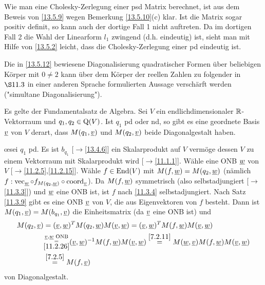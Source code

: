\documentclass[../../main.tex]{subfiles}
\begin{document}
\begin{bem}\label{14.2.14}
Wie man eine Cholesky-Zerlegung einer psd Matrix berechnet, ist aus dem Beweis von \ref{13.5.9} wegen Bemerkung \ref{13.5.10}(c) klar. Ist die Matrix sogar positiv definit, so kann auch der dortige Fall 1 nicht auftreten. Da im dortigen Fall 2 die Wahl der Linearform $l_1$ zwingend (d.h. eindeutig) ist, sieht man mit Hilfe von \ref{13.5.2} leicht, dass die Cholesky-Zerlegung einer pd eindeutig ist.
\end{bem}

Die in \ref{13.5.12} bewiesene Diagonalisierung quadratischer Formen über beliebigen Körper mit $0\neq 2$ kann über dem Körper der reellen Zahlen zu folgender in $\S 11.3$ in einer anderen Sprache formulierten Aussage verschärft werden ("simultane Diagonalisierung").

\begin{sat}\label{14.2.15}
Es gelte der Fundamentalsatz de Algebra. Sei $V$ ein endlichdimensionaler $\mathbb R$-Vektorraum und $q_1,q_2\in \operatorname{Q}(V)$. Ist $q_1$ pd oder nd, so gibt es eine geordnete Basis ${\underline v}$ von $V$ derart, dass $M(q_1,{\underline v})$ und $M(q_2,{\underline v})$ beide Diagonalgestalt haben.
\end{sat}
\begin{cproof}
\oe sei $q_1$ pd. Es ist $b_{q_1}$ [$\to$\ref{13.4.6}] ein Skalarprodukt auf $V$ vermöge dessen $V$ zu einem Vektorraum mit Skalarprodukt wird [$\to$\ref{11.1.1}]. Wähle eine ONB ${\underline w}$ von $V$ [$\to$\ref{11.2.5},\ref{11.2.15}]. Wähle $f\in\operatorname{End}(V)$ mit $M(f,{\underline w})=M(q_2,{\underline w})$ (nämlich $f:\operatorname{vec}_{\underline w}\circ f_{M(q_2,{\underline w})}\circ\operatorname{coord}_{\underline v}$). Da $M(f,{\underline w})$ symmetrisch (also selbstadjungiert [$\to$\ref{11.3.3}]) und ${\underline w}$ eine ONB ist, ist $f$ nach \ref{11.3.4} selbstadjungiert. Nach Satz \ref{11.3.9} gibt es eine ONB ${\underline v}$ von $V$, die aus Eigenvektoren von $f$ besteht. Dann ist $M(q_1,{\underline v})=M(b_{q_1},{\underline v})$ die Einheitsmatrix (da ${\underline v}$ eine ONB ist) und
\begin{align*}
M(q_2,{\underline v})&=({\underline v},{\underline w})^TM(q_2,{\underline w})M({\underline v},{\underline w})=({\underline v},{\underline w})^TM(f,{\underline w})M({\underline v},{\underline w})\\
&\substack{{\underline v},{\underline w}\text{ ONB}\\=\\\ref{11.2.26}}({\underline v},{\underline w})^{-1}M(f,{\underline w})M({\underline v},{\underline w})\stackrel{\ref{7.2.11}}{=}M({\underline w},{\underline v})M(f,{\underline w})M({\underline v},{\underline w})\\
&\stackrel{\ref{7.2.5}}{=}M(f,{\underline v})
\end{align*}
von Diagonalgestalt.
\end{cproof}
\end{document}
